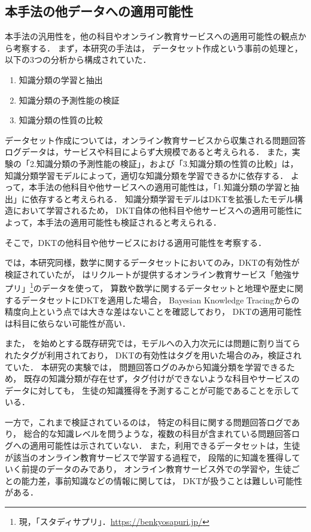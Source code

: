 \subsection{本手法の他データへの適用可能性}
本手法の汎用性を，他の科目やオンライン教育サービスへの適用可能性の観点から考察する．
まず，本研究の手法は，
データセット作成という事前の処理と，以下の3つの分析から構成されていた．
\begin{enumerate}
	\item 知識分類の学習と抽出
	\item 知識分類の予測性能の検証
	\item 知識分類の性質の比較
\end{enumerate}

データセット作成については，オンライン教育サービスから収集される問題回答ログデータは，サービスや科目によらず大規模であると考えられる．
また，実験の「2.知識分類の予測性能の検証」，および「3.知識分類の性質の比較」は，
知識分類学習モデルによって，適切な知識分類を学習できるかに依存する．
よって，本手法の他科目や他サービスへの適用可能性は，「1.知識分類の学習と抽出」に依存すると考えられる．
知識分類学習モデルはDKTを拡張したモデル構造において学習されるため，
DKT自体の他科目や他サービスへの適用可能性によって，本手法の適用可能性も検証されると考えられる．


そこで，DKTの他科目や他サービスにおける適用可能性を考察する．

\cite{piech2015deep}では，本研究同様，数学に関するデータセットにおいてのみ，DKTの有効性が検証されていたが，
\cite{nasuno2016深層学習}はリクルートが提供するオンライン教育サービス「勉強サプリ」\footnote{現，「スタディサプリ」．\url{https://benkyosapuri.jp/}}のデータを使って，
算数や数学に関するデータセットと地理や歴史に関するデータセットにDKTを適用した場合，
Bayesian Knowledge Tracingからの精度向上という点では大きな差はないことを確認しており，
DKTの適用可能性は科目に依らない可能性が高い．

また，
\cite{piech2015deep}を始めとする既存研究では，モデルへの入力次元には問題に割り当てられたタグが利用されており，
DKTの有効性はタグを用いた場合のみ，検証されていた．
本研究の実験では，
問題回答ログのみから知識分類を学習できるため，
既存の知識分類が存在せず，タグ付けができないような科目やサービスのデータに対しても，
生徒の知識獲得を予測することが可能であることを示している．


一方で，これまで検証されているのは，
特定の科目に関する問題回答ログであり，
総合的な知識レベルを問うような，複数の科目が含まれている問題回答ログへの適用可能性は示されていない．
また，利用できるデータセットは，生徒が該当のオンライン教育サービスで学習する過程で，
段階的に知識を獲得していく前提のデータのみであり，
オンライン教育サービス外での学習や，生徒ごとの能力差，事前知識などの情報に関しては，
DKTが扱うことは難しい可能性がある．


